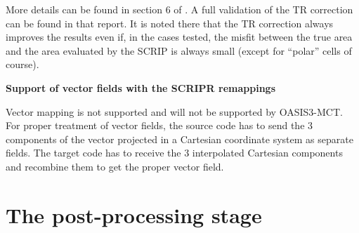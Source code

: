 More details can be found in section 6 of \cite{valcke19}. A full validation of the TR correction can be found in that report. It is noted there that the TR correction always improves the results even if, in the cases tested, the misfit between the true area and the area evaluated by the SCRIP is always small (except for ``polar'' cells of course).  







  {\bf Support of vector fields with the SCRIPR remappings}

  Vector mapping is not supported and will not be supported by
  OASIS3-MCT. For proper treatment of vector fields, the source 
  code has to send the 3 components of the vector projected in a
  Cartesian coordinate system as separate fields. The target 
  code has to receive the 3 interpolated Cartesian components and
  recombine them to get the proper vector field.

\section{The post-processing stage}
\label{subsec_cooking}

